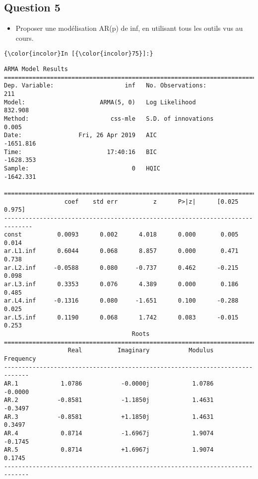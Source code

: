 \documentclass[11pt]{article}
\providecommand{\tightlist}{%
      \setlength{\itemsep}{0pt}\setlength{\parskip}{0pt}}
\begin{document}
    \subsection{Question 5}\label{question-5}

\begin{itemize}
\tightlist
\item
  Proposer une modélisation AR(p) de inf, en utilisant tous les outils
  vus au cours.
\end{itemize}

    \begin{Verbatim}[commandchars=\\\{\}]
{\color{incolor}In [{\color{incolor}75}]:} 
\end{Verbatim}


    \begin{Verbatim}[commandchars=\\\{\}]
                              ARMA Model Results                              
==============================================================================
Dep. Variable:                    inf   No. Observations:                  211
Model:                     ARMA(5, 0)   Log Likelihood                 832.908
Method:                       css-mle   S.D. of innovations              0.005
Date:                Fri, 26 Apr 2019   AIC                          -1651.816
Time:                        17:40:16   BIC                          -1628.353
Sample:                             0   HQIC                         -1642.331
                                                                              
==============================================================================
                 coef    std err          z      P>|z|      [0.025      0.975]
------------------------------------------------------------------------------
const          0.0093      0.002      4.018      0.000       0.005       0.014
ar.L1.inf      0.6044      0.068      8.857      0.000       0.471       0.738
ar.L2.inf     -0.0588      0.080     -0.737      0.462      -0.215       0.098
ar.L3.inf      0.3353      0.076      4.389      0.000       0.186       0.485
ar.L4.inf     -0.1316      0.080     -1.651      0.100      -0.288       0.025
ar.L5.inf      0.1190      0.068      1.742      0.083      -0.015       0.253
                                    Roots                                    
=============================================================================
                  Real          Imaginary           Modulus         Frequency
-----------------------------------------------------------------------------
AR.1            1.0786           -0.0000j            1.0786           -0.0000
AR.2           -0.8581           -1.1850j            1.4631           -0.3497
AR.3           -0.8581           +1.1850j            1.4631            0.3497
AR.4            0.8714           -1.6967j            1.9074           -0.1745
AR.5            0.8714           +1.6967j            1.9074            0.1745
-----------------------------------------------------------------------------

    \end{Verbatim}
\end{document}
